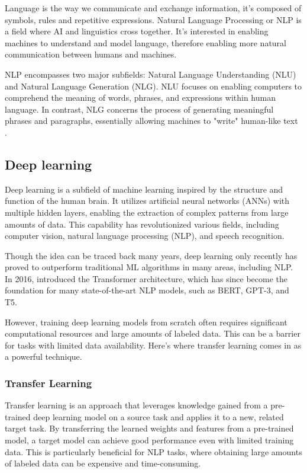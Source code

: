 \documentclass[12.5pt]{article}
\begin{document}
Language is the way we communicate and exchange information, it’s composed of symbols, rules and repetitive expressions. Natural Language Processing or NLP is a field where AI and linguistics cross together. It's interested in enabling machines to understand and model language, therefore enabling more natural communication between humans and machines.

NLP encompasses two major subfields: Natural Language Understanding (NLU) and Natural Language Generation (NLG). NLU focuses on enabling computers to comprehend the meaning of words, phrases, and expressions within human language. In contrast, NLG concerns the process of generating meaningful phrases and paragraphs, essentially allowing machines to "write" human-like text \cite{Khurana2023}.

\subsection{Deep learning}

Deep learning is a subfield of machine learning inspired by the structure and function of the human brain. It utilizes artificial neural networks (ANNs) with multiple hidden layers, enabling the extraction of complex patterns from large amounts of data. This capability has revolutionized various fields, including computer vision, natural language processing (NLP), and speech recognition.

Though the idea can be traced back many years, deep learning only recently has proved to outperform traditional ML algorithms in many areas, including NLP. In 2016, \cite{Vaswani2017} introduced the Transformer architecture, which has since become the foundation for many state-of-the-art NLP models, such as BERT, GPT-3, and T5.

However, training deep learning models from scratch often requires significant computational resources and large amounts of labeled data. This can be a barrier for tasks with limited data availability. Here's where transfer learning comes in as a powerful technique.

\subsubsection{Transfer Learning}

Transfer learning is an approach that leverages knowledge gained from a pre-trained deep learning model on a source task and applies it to a new, related target task. By transferring the learned weights and features from a pre-trained model, a target model can achieve good performance even with limited training data. This is particularly beneficial for NLP tasks, where obtaining large amounts of labeled data can be expensive and time-consuming.
\end{document}
